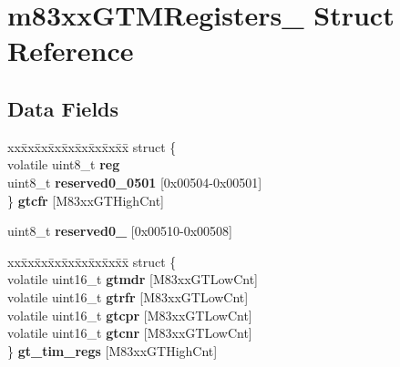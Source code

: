\hypertarget{structm83xxGTMRegisters__}{}\section{m83xx\+G\+T\+M\+Registers\+\_\+ Struct Reference}
\label{structm83xxGTMRegisters__}
\subsection*{Data Fields}
\begin{DoxyCompactItemize}
\item 
\mbox{\label{structm83xxGTMRegisters___a57f6a4963b40337bd61215cef76f29e8}} 
\begin{tabbing}
xx\=xx\=xx\=xx\=xx\=xx\=xx\=xx\=xx\=\kill
struct \{\\
\>volatile uint8\_t {\bfseries reg}\\
\>uint8\_t {\bfseries reserved0\_0501} \mbox{[}0x00504-\/0x00501\mbox{]}\\
\} {\bfseries gtcfr} \mbox{[}M83xxGTHighCnt\mbox{]}\\

\end{tabbing}\item 
\mbox{\label{structm83xxGTMRegisters___ae2a3ab0dde44b3d2c39db3aa624f58e3}} 
uint8\+\_\+t {\bfseries reserved0\+\_} \mbox{[}0x00510-\/0x00508\mbox{]}
\item 
\mbox{\label{structm83xxGTMRegisters___afa4c0efb3dfef62013cef25425ae9cf1}} 
\begin{tabbing}
xx\=xx\=xx\=xx\=xx\=xx\=xx\=xx\=xx\=\kill
struct \{\\
\>volatile uint16\_t {\bfseries gtmdr} \mbox{[}M83xxGTLowCnt\mbox{]}\\
\>volatile uint16\_t {\bfseries gtrfr} \mbox{[}M83xxGTLowCnt\mbox{]}\\
\>volatile uint16\_t {\bfseries gtcpr} \mbox{[}M83xxGTLowCnt\mbox{]}\\
\>volatile uint16\_t {\bfseries gtcnr} \mbox{[}M83xxGTLowCnt\mbox{]}\\
\} {\bfseries gt\_tim\_regs} \mbox{[}M83xxGTHighCnt\mbox{]}\\


\end{tabbing}
\end{DoxyCompactItemize}
